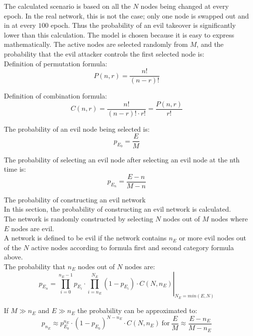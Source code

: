 The calculated scenario is based on all the $N$ nodes being changed at every epoch. In the real network, this is not the case; only one node is swapped out and in at every $100$ epoch. Thus the probability of an evil takeover is significantly lower than this calculation. The model is chosen because it is easy to express mathematically. 
The active nodes are selected randomly from $M$, and the probability that the evil attacker controls the first selected node is:\\

Definition of permutation formula:
\begin{equation}
 P(n,r) = \frac{n!}{(n-r)!}
\end{equation}

Definition of combination formula:
\begin{equation}
 C(n,r) = \frac{n!}{(n-r)! \cdot r!} = \frac{P(n,r)}{r!}
\end{equation}


The probability of an evil node being selected is:
\begin{equation}
 p_{E_0} = \frac{E}{M}
\end{equation}

The probability of selecting an evil node after selecting an evil node at the nth time is:
\begin{equation}
 p_{E_n} = \frac{E-n}{M-n}
\end{equation}


The probability of constructing an evil network\\
In this section, the probability of constructing an evil network is calculated.\\
The network is randomly constructed by selecting $N$ nodes out of $M$ nodes where $E$ nodes are evil.\\
A network is defined to be evil if the network contains $n_E$ or more evil nodes out of the $N$ active nodes according to formula first and second category formula above.\\

The probability that $n_E$ nodes out of $N$ nodes are:
\begin{equation}
 p_{E_n} = \left. \prod_{i=0}^{n_E-1}{p_{E_i}} \cdot \prod_{i=n_E}^{N_E}{(1-p_{E_i}) \cdot C(N,n_E)} \right| _{N_E = min(E,N)}
\end{equation}


If $M \gg n_E$  and $E \gg n_E$  the probability can be approximated to:
\begin{equation}
 p_{n_E} \approx p_{E_0}^{n_E} \cdot (1-p_{E_0})^{N-n_E} \cdot C(N,n_E) ~ \text{for} ~ \frac{E}{M} \approx \frac{E-n_E}{M-n_E}
\end{equation}

